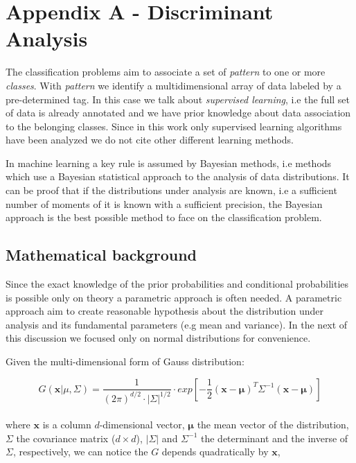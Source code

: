 \documentclass{standalone}
\begin{document}
\chapter*{Appendix A - Discriminant Analysis}

The classification problems aim to associate a set of \emph{pattern} to one or more \emph{classes}.
With \emph{pattern} we identify a multidimensional array of data labeled by a pre-determined tag.
In this case we talk about \emph{supervised learning}, i.e the full set of data is already annotated and we have prior knowledge about data association to the belonging classes.
Since in this work only supervised learning algorithms have been analyzed we do not cite other different learning methods.

In machine learning a key rule is assumed by Bayesian methods, i.e methods which use a Bayesian statistical approach to the analysis of data distributions.
It can be proof that if the distributions under analysis are known, i.e a sufficient number of moments of it is known with a sufficient precision, the Bayesian approach is the best possible method to face on the classification problem. %





\section*{Mathematical background}

Since the exact knowledge of the prior probabilities and conditional probabilities is possible only on theory a parametric approach is often needed.
A parametric approach aim to create reasonable hypothesis about the distribution under analysis and its fundamental parameters (e.g mean and variance).
In the next of this discussion we focused only on normal distributions for convenience.

Given the multi-dimensional form of Gauss distribution:

$$
G(\mathbf{x}|\mu, \Sigma) = \frac{1}{(2\pi)^{d/2}\cdot\left|\Sigma\right|^{1/2}}\cdot exp\left[-\frac{1}{2}(\mathbf{x}-\mathbf{\mu})^T\Sigma^{-1}(\mathbf{x}-\mathbf{\mu})\right]
$$
\\
where $\mathbf{x}$ is a column $d$-dimensional vector, $\mathbf{\mu}$ the mean vector of the distribution, $\Sigma$ the covariance matrix ($d\times d$), $|\Sigma|$ and $\Sigma^{-1}$ the determinant and the inverse of $\Sigma$, respectively, we can notice the $G$ depends quadratically by $\mathbf{x}$,
\end{document}
